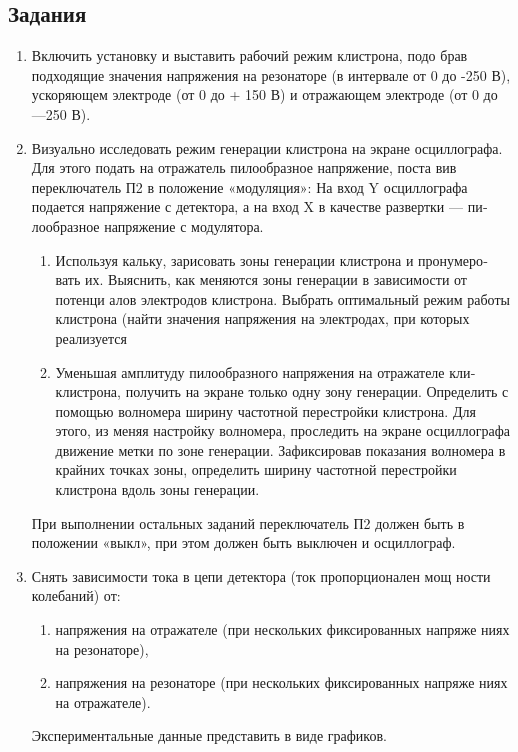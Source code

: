 \subsection{Задания}
\begin{enumerate}
	\item  Включить установку и выставить рабочий режим клистрона, подо­
	брав подходящие значения напряжения на резонаторе (в интервале от 0 до
	-250 В), ускоряющем электроде (от 0 до + 150 В) и отражающем электроде
	(от 0 до —250 В).
	\item  Визуально исследовать режим генерации клистрона на экране осцил­лографа. Для этого подать на отражатель пилообразное напряжение, поста­
	вив переключатель П2 в положение «модуляция»: На вход Y осциллографа
	подается напряжение с детектора, а на вход X в качестве развертки — пи­лообразное напряжение с модулятора.
		\begin{enumerate}
			\item Используя кальку, зарисовать зоны генерации клистрона и пронумеро­
			вать их. Выяснить, как меняются зоны генерации в зависимости от потенци­
			алов электродов клистрона. Выбрать оптимальный режим работы клистро­на (найти значения напряжения на электродах, при которых реализуется
			\item Уменьшая амплитуду пилообразного напряжения на отражателе кли­
			клистрона, получить на экране только одну зону генерации. Определить с по­мощью волномера ширину частотной перестройки клистрона. Для этого, из­
			меняя настройку волномера, проследить на экране осциллографа движение
			метки по зоне генерации. Зафиксировав показания волномера в крайних
			точках зоны, определить ширину частотной перестройки клистрона вдоль
			зоны генерации.
		\end{enumerate}
	
	При выполнении остальных заданий переключатель П2 должен быть в
	положении «выкл», при этом должен быть выключен и осциллограф.

	\item Снять зависимости тока в цепи детектора (ток пропорционален мощ­
	ности колебаний) от: 
		\begin{enumerate}
			\item напряжения на отражателе (при нескольких фиксированных напряже­
			ниях на резонаторе),
			\item напряжения на резонаторе (при нескольких фиксированных напряже­
			ниях на отражателе).
		\end{enumerate} 
	Экспериментальные данные представить в виде графиков.
	

\end{enumerate}
